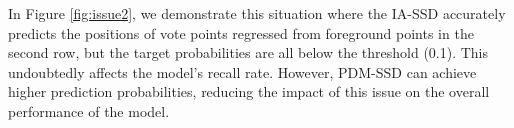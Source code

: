 In Figure \ref{fig:issue2}, we demonstrate this situation where the IA-SSD accurately predicts the positions of vote points regressed from foreground points in the second row, but the target probabilities are all below the threshold (0.1). This undoubtedly affects the model's recall rate. However, PDM-SSD can achieve higher prediction probabilities, reducing the impact of this issue on the overall performance of the model.